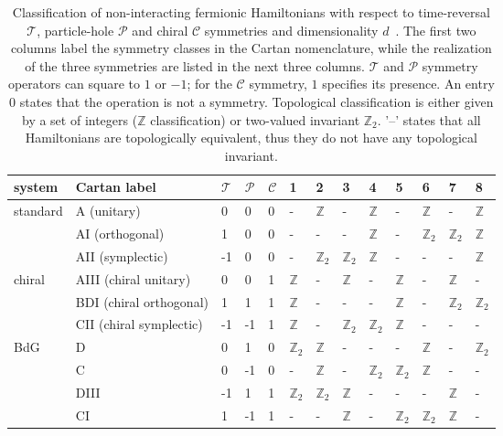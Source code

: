 \begin{table}[H]
\begin{tabularx}{\linewidth}{| >{\centering\arraybackslash} m{}| >{\centering\arraybackslash} m{}||Y|Y|Y||Y|Y|Y|Y|Y|Y|Y|Y|}
\hline
system & Cartan label & $\mathcal{T}$ & $\mathcal{P}$ & $\mathcal{C}$ & 1 & 2 & 3 & 4 & 5 & 6 & 7 & 8 \\
\hline
\hline
standard & A (unitary) & 0 & 0 & 0 & - & $\mathbb{Z}$ & - &   $\mathbb{Z}$ & - &  $\mathbb{Z}$  & -  &$\mathbb{Z}$ \\
 & AI (orthogonal) & 1 & 0 & 0 & - & - & - & $\mathbb{Z}$ & - & $\mathbb{Z}_2$ & $\mathbb{Z}_2$ & $\mathbb{Z}$ \\
 & AII (symplectic) & -1 & 0 & 0 & - & $\mathbb{Z}_2$ & $\mathbb{Z}_2$ & $\mathbb{Z}$ & - & - & - & $\mathbb{Z}$  \\
\hline
\hline
 chiral & AIII (chiral unitary) & 0 & 0 & 1 & $\mathbb{Z}$ & - & $\mathbb{Z}$ & - & $\mathbb{Z}$ & - & $\mathbb{Z}$  & - \\
 & BDI (chiral orthogonal) & 1 & 1 & 1 & $\mathbb{Z}$ & - & - & - & $\mathbb{Z}$ & - & $\mathbb{Z}_2$ & $\mathbb{Z}_2$  \\
 & CII (chiral symplectic) & -1 & -1 & 1 & $\mathbb{Z}$ & - & $\mathbb{Z}_2$ & $\mathbb{Z}_2$ & $\mathbb{Z}$ & - & - & - \\
\hline
\hline
BdG & D & 0 & 1 & 0 & $\mathbb{Z}_2$ & $\mathbb{Z}$ & - & - & - & $\mathbb{Z}$ & - &$\mathbb{Z}_2$  \\
& C & 0 & -1 & 0 & - & $\mathbb{Z}$ & - & $\mathbb{Z}_2$ & $\mathbb{Z}_2$ & $\mathbb{Z}$ & - & - \\
 & DIII & -1 & 1 & 1 &  $\mathbb{Z}_2$ &  $\mathbb{Z}_2$ &  $\mathbb{Z}$ & - & - &- & $\mathbb{Z}$ & - \\
 & CI & 1 & -1 & 1 & - & - & $\mathbb{Z}$ & - & $\mathbb{Z}_2$ & $\mathbb{Z}_2$  & $\mathbb{Z}$ & -  \\
\hline
\end{tabularx}
\caption[Classification of non-interacting fermionic Hamiltonians]{Classification of non-interacting fermionic Hamiltonians with respect to time-reversal $\mathcal{T}$, particle-hole $\mathcal{P}$ and chiral $\mathcal{C}$ symmetries and dimensionality $d$~\cite{10foldKitaev2009, 10foldRyu2010}. The first two columns label the symmetry classes in the Cartan nomenclature, while the realization of the three symmetries are listed in the next three columns. $\mathcal{T}$ and $\mathcal{P}$ symmetry operators can square to $1$ or $-1$; for the $\mathcal{C}$ symmetry, $1$ specifies its presence. An entry $0$ states that the operation is not a symmetry. Topological classification is either given by a set of integers ($\mathbb{Z}$ classification) or two-valued invariant $\mathbb{Z}_2$.  '--' states that all Hamiltonians are topologically equivalent, thus they do not have any topological invariant.}
\label{tab:10fold}
\end{table}

